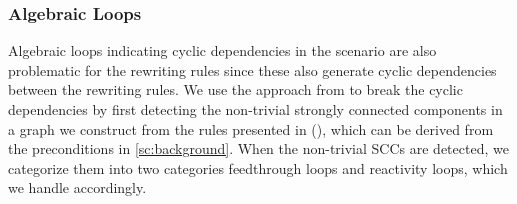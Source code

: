 \subsubsection{Algebraic Loops}
Algebraic loops indicating cyclic dependencies in the scenario are also problematic for the rewriting rules since these also generate cyclic dependencies between the rewriting rules. 
We use the approach from \cite{thrane2021} to break the cyclic dependencies by first detecting the non-trivial strongly connected components in a graph we construct from the rules presented in (), which can be derived from the preconditions in \cref{sc:background}.
When the non-trivial SCCs are detected, we categorize them into two categories feedthrough loops and reactivity loops, which we handle accordingly.

